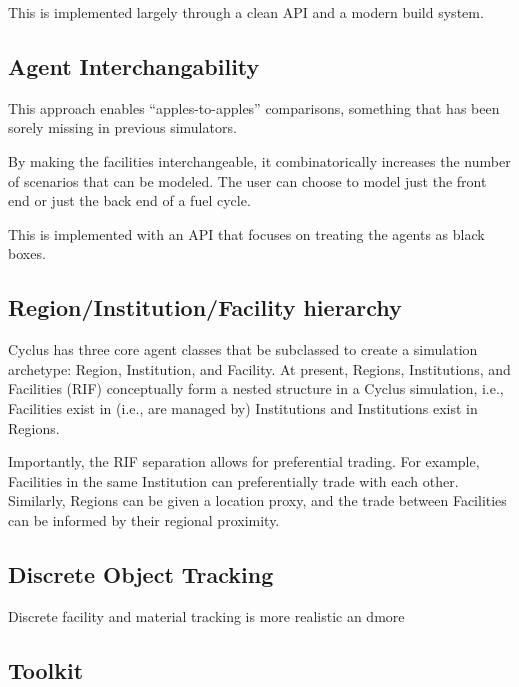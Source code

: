 This is implemented largely through a clean API and a modern build system.

\subsection{Agent Interchangability}

This approach enables ``apples-to-apples'' comparisons, something that has been 
sorely missing in previous simulators.

By making the facilities interchangeable, it combinatorically increases the 
number of scenarios that can be modeled. The user can choose to model just the 
front end or just the back end of a fuel cycle. 

This is implemented with an API that focuses on treating the agents as black 
boxes. 

\subsection{Region/Institution/Facility hierarchy}

Cyclus has three core agent classes that be subclassed to create a simulation
archetype: Region, Institution, and Facility. At present, Regions, Institutions,
and Facilities (RIF) conceptually form a nested structure in a Cyclus simulation,
i.e., Facilities exist in (i.e., are managed by) Institutions and Institutions
exist in Regions.

Importantly, the RIF separation allows for preferential trading. For example,
Facilities in the same Institution can preferentially trade with each
other. Similarly, Regions can be given a location proxy, and the trade between
Facilities can be informed by their regional proximity.

\subsection{Discrete Object Tracking}

Discrete facility and material tracking is more realistic an dmore 

\subsection{Toolkit}

